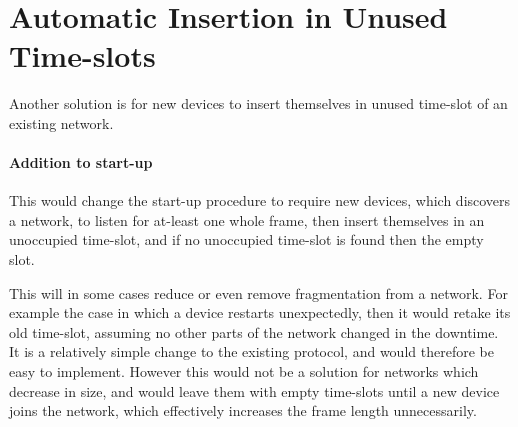 \section{Automatic Insertion in Unused Time-slots}
Another solution is for new devices to insert themselves in unused time-slot of an existing network.

\paragraph{Addition to start-up}
This would change the start-up procedure to require new devices, which discovers a network, to listen for at-least one whole frame, then insert themselves in an unoccupied time-slot, and if no unoccupied time-slot is found then the empty slot. 

\bigskip

This will in some cases reduce or even remove fragmentation from a network. 
For example the case in which a device restarts unexpectedly, then it would retake its old time-slot, assuming no other parts of the network changed in the downtime.
It is a relatively simple change to the existing protocol, and would therefore be easy to implement.  
However this would not be a solution for networks which decrease in size, and would leave them with empty time-slots until a new device joins the network, which effectively increases the frame length unnecessarily.